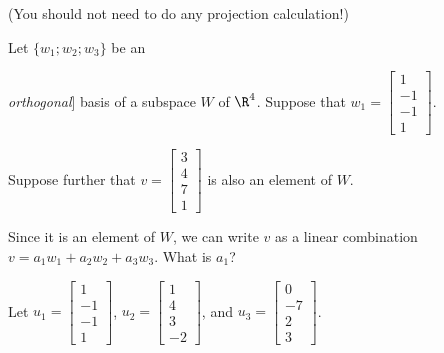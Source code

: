 (You should not need to do any projection calculation!)  









\endedxproblem










Let $\{w_1; w_2; w_3\}$ be an {\emph{orthogonal}] basis of a subspace $W$ of $\R^4$.  
Suppose that 
$w_1 = \left[ \begin{array}{c} 1 \\ -1 \\ -1 \\ 1 \end{array} \right]$.  

Suppose further that $v = \left[ \begin{array}{c} 3 \\ 4 \\ 7 \\ 1 \end{array} \right]$ is also 
an element of $W$.   

Since it is an element of $W$, we can write $v$ as a 
linear combination $v = a_1 w_1 + a_2 w_2 + a_3w_3$.  
What is $a_1$?  




\edXsolution{

}

\endedxproblem


\endedxvertical








Let $u_1 = \left[ \begin{array}{c} 1 \\ -1 \\ -1 \\ 1 \end{array} \right]$,
$u_2 = \left[ \begin{array}{c} 1 \\ 4 \\ 3 \\ -2 \end{array} \right]$,
and $u_3 = \left[ \begin{array}{c} 0 \\ -7 \\ 2 \\ 3 \end{array} \right]$.  

}
